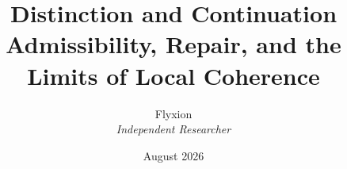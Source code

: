 \newcommand{\Hol}{\operatorname{Hol}}
\newcommand{\Tr}{\operatorname{Tr}}
\newcommand{\Adm}{\operatorname{Adm}}
\newcommand{\Pop}{\mathrm{Pop}}
\newcommand{\Refuse}{\mathrm{Refuse}}
\newcommand{\Bind}{\mathrm{Bind}}
\newcommand{\Collapse}{\mathrm{Collapse}}
\usepackage{stmaryrd}
\usepackage{mathrsfs}


\title{Distinction and Continuation \\[0.3em] \large Admissibility, Repair, and the Limits of Local Coherence}
\author{Flyxion \\ \textit{Independent Researcher}}
\date{August 2026}
